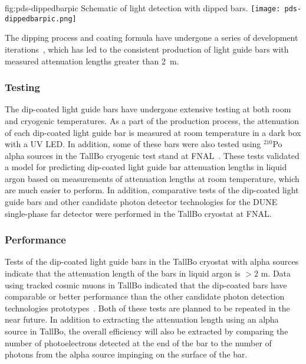 \begin{dunefigure}{fig:pds-dippedbarpic}
{Schematic of light detection with dipped bars.}
  \texttt{[image: pds-dippedbarpic.png]}
\end{dunefigure}

The dipping process and coating formula have undergone a series of development iterations~\cite{moss-2015},
which has led to the consistent production of light guide bars with measured attenuation lengths greater than 2~m. 

\subsubsection{Testing}

The dip-coated light guide bars have undergone extensive testing at both room and cryogenic temperatures.  As a part of the production process, the attenuation of each dip-coated light guide bar is measured at room temperature in a dark box with a UV LED.  In addition, some of these bars were also tested using $^{210}$Po alpha sources in the TallBo cryogenic test stand at FNAL~\cite{moss-2016}.
These tests validated a model for predicting dip-coated light guide bar attenuation lengths in liquid argon based on measurements of attenuation lengths at room temperature, which are much easier to perform.  In addition, comparative tests of the dip-coated light guide bars and other candidate photon detector technologies for the DUNE single-phase far detector were performed in the TallBo cryostat at FNAL.

\subsubsection{Performance}

Tests of the dip-coated light guide bars in the TallBo cryostat with alpha sources indicate that the attenuation length of the bars in liquid argon is $>2$ m.  Data using tracked cosmic muons in TallBo indicated that the dip-coated bars have comparable or better performance than the other candidate photon detection technologies prototypes~\cite{whittington-2016}.
Both of these tests are planned to be repeated in the near future.  In addition to extracting the attenuation length using an alpha source in TallBo, the overall efficiency will also be extracted by comparing the number of photoelectrons detected at the end of the bar to the number of photons from the alpha source impinging on the surface of the bar.

